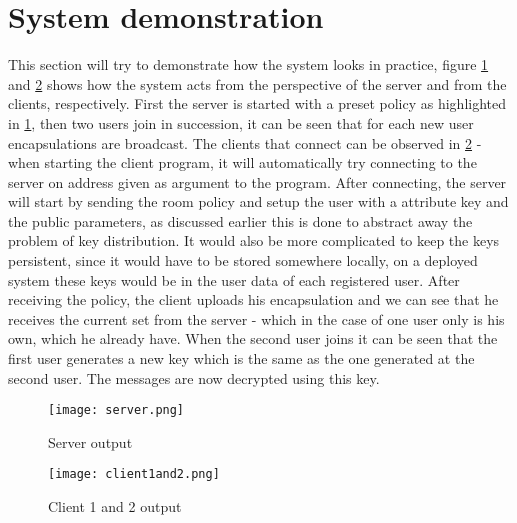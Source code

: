 \section{System demonstration}
This section will try to demonstrate how the system looks in practice, figure \ref{fig:server-output} and \ref{fig:client12-output} shows how the system acts from the perspective of the server and from the clients, respectively. First the server is started with a preset policy as highlighted in \ref{fig:server-output}, then two users join in succession, it can be seen that for each new user encapsulations are broadcast. The clients that connect can be observed in \ref{fig:client12-output} - when starting the client program, it will automatically try connecting to the server on address given as argument to the program. After connecting, the server will start by sending the room policy and setup the user with a attribute key and the public parameters, as discussed earlier this is done to abstract away the problem of key distribution. It would also be more complicated to keep the keys persistent, since it would have to be stored somewhere locally, on a deployed system these keys would be in the user data of each registered user. After receiving the policy, the client uploads his encapsulation and we can see that he receives the current set from the server - which in the case of one user only is his own, which he already have. When the second user joins it can be seen that the first user generates a new key which is the same as the one generated at the second user. The messages are now decrypted using this key.
\begin{figure}
\centering
\texttt{[image: server.png]}
\caption{Server output}
\label{fig:server-output}
\end{figure}

\begin{figure}
\centering
\texttt{[image: client1and2.png]}
\caption{Client 1 and 2 output}
\label{fig:client12-output}
\end{figure}
